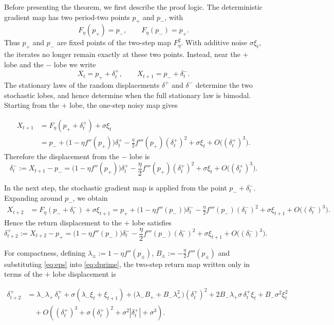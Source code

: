 \documentclass{article} %
\theoremstyle{plain}
\theoremstyle{definition}
\begin{document}
Before presenting the theorem, we first describe the proof logic. The
deterministic gradient map has two period-two points \(p_+\) and \(p_-\), with
\[
    F_\eta(p_+)=p_-,
    \qquad
    F_\eta(p_-)=p_+ .
\]
Thus \(p_+\) and \(p_-\) are fixed points of the two-step map \(F_\eta^2\). With
additive noise \(\sigma \xi_t\), the iterates no longer remain exactly at these
two points. Instead, near the \(+\) lobe and the \(-\) lobe we write
\[
    X_t = p_+ + \delta_t^+,
    \qquad
    X_{t+1}=p_-+\delta_t^- .
\]
The stationary laws of the random displacements \(\delta^+\) and \(\delta^-\)
determine the two stochastic lobes, and hence determine when the full stationary
law is bimodal. Starting from the \(+\) lobe, the one-step noisy map gives


\[
\begin{aligned}
X_{t+1}
&=
F_\eta(p_+ + \delta_t^+) + \sigma \xi_t  \\
&=
p_-
+
\bigl(1-\eta f''(p_+)\bigr)\delta_t^+
-\frac{\eta}{2}f'''(p_+)(\delta_t^+)^2
+\sigma\xi_t
+O\bigl((\delta_t^+)^3\bigr).
\end{aligned}
\]
Therefore the displacement from the \(-\) lobe is
\begin{equation}
\delta_t^- 
:=
X_{t+1}-p_-
=
\bigl(1-\eta f''(p_+)\bigr)\delta_t^+
-\frac{\eta}{2}f'''(p_+)(\delta_t^+)^2
+\sigma\xi_t
+O\bigl((\delta_t^+)^3\bigr).
\label{eq:eps}
\end{equation}

In the next step, the stochastic gradient map is applied from the point
\(p_-+\delta_t^-\). Expanding around \(p_-\), we obtain
\[
\begin{aligned}
X_{t+2}
&=
F_\eta(p_-+\delta_t^-)+\sigma\xi_{t+1} =
p_+
+
\bigl(1-\eta f''(p_-)\bigr)\delta_t^-
-\frac{\eta}{2}f'''(p_-)(\delta_t^-)^2
+\sigma\xi_{t+1}
+O\bigl((\delta_t^-)^3\bigr).
\end{aligned}
\]
Hence the return displacement to the \(+\) lobe satisfies
\begin{equation}
\delta_{t+2}^+
:=
X_{t+2}-p_+
=
\bigl(1-\eta f''(p_-)\bigr)\delta_t^-
-\frac{\eta}{2}f'''(p_-)(\delta_t^-)^2
+\sigma\xi_{t+1}
+O\bigl((\delta_t^-)^3\bigr).
\label{eq:dprime}
\end{equation}

For compactness, defining $\lambda_\pm:=1-\eta f''(p_\pm)$, $B_\pm:=-\frac{\eta}{2}f'''(p_\pm)$ and 
substituting \eqref{eq:eps} into \eqref{eq:dprime}, the two-step return map
written only in terms of the \(+\) lobe displacement is

\begin{align}
\label{stoch-recursion}
\delta_{t+2}^+
&=
\lambda_-\lambda_+\,\delta_t^+
+\sigma(\lambda_-\xi_t+\xi_{t+1}) +\bigl(\lambda_-B_+ + B_-\lambda_+^2\bigr)(\delta_t^+)^2
+2B_-\lambda_+\sigma\,\delta_t^+\xi_t
+B_-\sigma^2\xi_t^2 \\
&\quad
+O\!\left((\delta_t^+)^3+\sigma(\delta_t^+)^2+\sigma^2|\delta_t^+|+\sigma^3\right).
\end{align}
\end{document}
